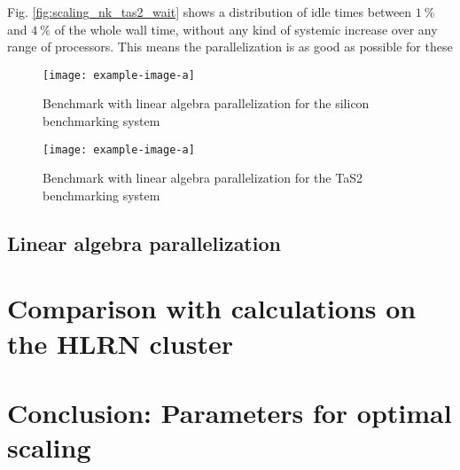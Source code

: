 \documentclass[main.tex]{subfiles}
\begin{document}
Fig. \ref{fig:scaling_nk_tas2_wait} shows a distribution of idle times between \(\SI{1}{\percent}\) and \(\SI{4}{\percent}\) of the whole wall time, without any kind of systemic increase over any range of processors.
This means the parallelization is as good as possible for these 

\begin{figure}[ht!]
    \centering
    \texttt{[image: example-image-a]}
    \caption{Benchmark with linear algebra parallelization for the silicon benchmarking system}
    \label{fig:scaling_nd_si}
\end{figure}

\begin{figure}[ht!]
    \centering
    \texttt{[image: example-image-a]}
    \caption{Benchmark with linear algebra parallelization for the TaS2 benchmarking system}
    \label{fig:scaling_nd_tas2}
\end{figure}

\subsection{Linear algebra parallelization}


\section{Comparison with calculations on the HLRN cluster}

\section{Conclusion: Parameters for optimal scaling}
\end{document}
